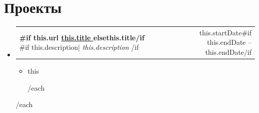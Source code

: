 \documentclass[letterpaper,11pt]{article}
\makeatletter
\newcommand{\resumeItem}[1]{
  \item\small{
    {#1 \vspace{-2pt}}
  }
}
\newcommand{\resumeProjectHeading}[2]{
    \item
    \begin{tabular*}{0.97\textwidth}{l@{\extracolsep{\fill}}r}
      \small#1 & #2 \\
    \end{tabular*}\vspace{-7pt}
}
\newcommand{\resumeSubHeadingListStart}{\begin{itemize}[leftmargin=0.15in, label={}]}
\newcommand{\resumeSubHeadingListEnd}{\end{itemize}}
\newcommand{\resumeItemListStart}{\begin{itemize}}
\newcommand{\resumeItemListEnd}{\end{itemize}\vspace{-5pt}}
\makeatother
\begin{document}
\section{Проекты}
    \resumeSubHeadingListStart
    {{#each projects}}
      \resumeProjectHeading
        { \textbf{ {{#if this.url}} \href{ {{this.url}} }{ {{this.title}} } {{else}}{{this.title}}{{/if}} }{{#if this.description}}$|$\emph{ {{this.description}} } {{/if}} }{ {{this.startDate}}{{#if this.endDate}} -- {{this.endDate}}{{/if}} }
          \resumeItemListStart
            {{#each this.responsibilities}}
              \resumeItem{ {{this}} }
            {{/each}}
          \resumeItemListEnd
    {{/each}}
    \resumeSubHeadingListEnd
\end{document}
